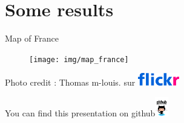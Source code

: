 \documentclass[newPxFont]{beamer}
\begin{document}
\section{Some results}


\begin{frame}[c]{Map of France}
\vspace{-2em}
\begin{figure}
	\centering
	\texttt{[image: img/map\_france]}
\end{figure}
\end{frame}


{
%
\begin{frame}
  \vspace{-1em}
  \begin{minipage}[t][.8\textheight]{\textwidth}

    \vfill

  \hfill \small{Photo credit : Thomas m-louis. sur \includegraphics[height=0.55cm]{img/flickr_logo}}
  \end{minipage}
  \vspace{-3em}
  \centering
	You can find this presentation on github\includegraphics[height=0.85cm]{img/github}

\end{frame}
}
\end{document}

